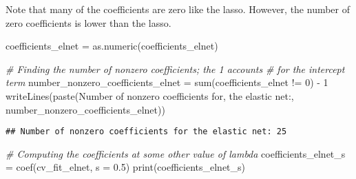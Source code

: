 \documentclass[
]{book}
\newenvironment{Shaded}{\begin{snugshade}}{\end{snugshade}}
\newcommand{\AttributeTok}[1]{\textcolor[rgb]{0.77,0.63,0.00}{#1}}
\newcommand{\CommentTok}[1]{\textcolor[rgb]{0.56,0.35,0.01}{\textit{#1}}}
\newcommand{\DecValTok}[1]{\textcolor[rgb]{0.00,0.00,0.81}{#1}}
\newcommand{\FloatTok}[1]{\textcolor[rgb]{0.00,0.00,0.81}{#1}}
\newcommand{\FunctionTok}[1]{\textcolor[rgb]{0.00,0.00,0.00}{#1}}
\newcommand{\NormalTok}[1]{#1}
\newcommand{\OtherTok}[1]{\textcolor[rgb]{0.56,0.35,0.01}{#1}}
\newcommand{\SpecialCharTok}[1]{\textcolor[rgb]{0.00,0.00,0.00}{#1}}
\newcommand{\StringTok}[1]{\textcolor[rgb]{0.31,0.60,0.02}{#1}}
\begin{document}
Note that many of the coefficients are zero like the lasso. However, the number of zero coefficients is lower than the lasso.

\begin{Shaded}
\begin{Highlighting}[]
\NormalTok{coefficients\_elnet }\OtherTok{=} \FunctionTok{as.numeric}\NormalTok{(coefficients\_elnet)}

\CommentTok{\# Finding the number of nonzero coefficients; the \textquotesingle{}{-}1\textquotesingle{} accounts}
\CommentTok{\# for the intercept term}
\NormalTok{number\_nonzero\_coefficients\_elnet }\OtherTok{=}
  \FunctionTok{sum}\NormalTok{(coefficients\_elnet }\SpecialCharTok{!=} \DecValTok{0}\NormalTok{) }\SpecialCharTok{{-}} \DecValTok{1}
\FunctionTok{writeLines}\NormalTok{(}\FunctionTok{paste}\NormalTok{(}\StringTok{\textquotesingle{}Number of nonzero coefficients for\textquotesingle{}}\NormalTok{,}
                 \StringTok{\textquotesingle{}the elastic net:\textquotesingle{}}\NormalTok{,}
\NormalTok{                 number\_nonzero\_coefficients\_elnet))}
\end{Highlighting}
\end{Shaded}

\begin{verbatim}
## Number of nonzero coefficients for the elastic net: 25
\end{verbatim}

\begin{Shaded}
\begin{Highlighting}[]
\CommentTok{\# Computing the coefficients at some other value of lambda}
\NormalTok{coefficients\_elnet\_s }\OtherTok{=} \FunctionTok{coef}\NormalTok{(cv\_fit\_elnet, }\AttributeTok{s =} \FloatTok{0.5}\NormalTok{)}
\FunctionTok{print}\NormalTok{(coefficients\_elnet\_s)}
\end{Highlighting}
\end{Shaded}
\end{document}
